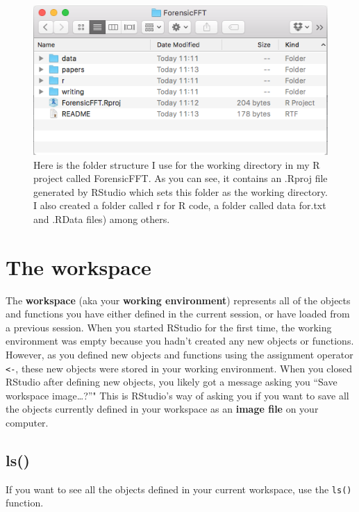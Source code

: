 \documentclass[]{book}
\theoremstyle{definition}
\theoremstyle{definition}
\theoremstyle{remark}
\begin{document}
\begin{figure}

{\centering \includegraphics[width=0.75\linewidth]{images/wd_ss} 

}

\caption{Here is the folder structure I use for the working directory in my R project called ForensicFFT. As you can see, it contains an .Rproj file generated by RStudio which sets this folder as the working directory. I also created a folder called r for R code, a folder called data for.txt and .RData files) among others.}\label{fig:forensic}
\end{figure}

\section{The workspace}\label{the-workspace}

The \textbf{workspace} (aka your \textbf{working environment})
represents all of the objects and functions you have either defined in
the current session, or have loaded from a previous session. When you
started RStudio for the first time, the working environment was empty
because you hadn't created any new objects or functions. However, as you
defined new objects and functions using the assignment operator
\texttt{\textless{}-}, these new objects were stored in your working
environment. When you closed RStudio after defining new objects, you
likely got a message asking you ``Save workspace image\ldots{}?''" This
is RStudio's way of asking you if you want to save all the objects
currently defined in your workspace as an \textbf{image file} on your
computer.

\subsection{ls()}\label{ls}

If you want to see all the objects defined in your current workspace,
use the \texttt{ls()} function.
\end{document}
